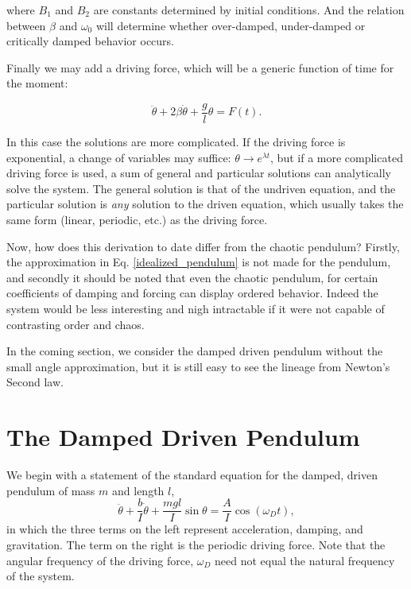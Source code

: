 \documentclass[12pt,twoside]{reedthesis}
\begin{document}
where $B_1$ and $B_2$ are constants determined by initial conditions.  And the relation between $\beta$ and $\omega_0$ will determine whether over-damped, under-damped or critically damped behavior occurs.  

Finally we may add a driving force, which will be a generic function of time for the moment:  

\begin{equation}
\label{damped_driven_harmonic_oscillator}
 \ddot{\theta} +  2 \beta \dot{\theta} + \frac{g}{l}\theta = F(t).
\end{equation}



In this case the solutions are more complicated.  If the driving force is exponential, a change of variables may suffice: $\theta \rightarrow e^{\lambda t}$, but if a more complicated driving force is used, a sum of general and particular solutions can analytically solve the system.  The general solution is that of the undriven equation, and the particular solution is \textit{any} solution to the driven equation, which usually takes the same form (linear, periodic, etc.) as the driving force.  

Now, how does this derivation to date differ from the chaotic pendulum?  Firstly, the approximation in Eq. \eqref{idealized_pendulum} is not made for the pendulum, and secondly it should be noted that even the chaotic pendulum, for certain coefficients of damping and forcing can display ordered behavior.  Indeed the system would be less interesting and nigh intractable if it were not capable of contrasting order and chaos.  

In the coming section, we consider the damped driven pendulum without the small angle approximation, but it is still easy to see the lineage from Newton's Second law.  


\section{The Damped Driven Pendulum}
We begin with a statement of the standard equation for the damped, driven pendulum of mass $m$  and length $l$,
\begin{equation}
\label{damped_driven_pendulum_0}
 \ddot{\theta} +  \frac{b}{I} \dot{\theta} + \frac{mgl}{I}\sin{\theta} = \frac{A}{I} \cos{(\omega_D t)},
\end{equation}
in which the three terms on the left represent acceleration, damping, and gravitation.  The term on the right is the periodic driving force. Note that the angular frequency of the driving force, $\omega_D$ need not equal the natural frequency of the system.  
\end{document}
